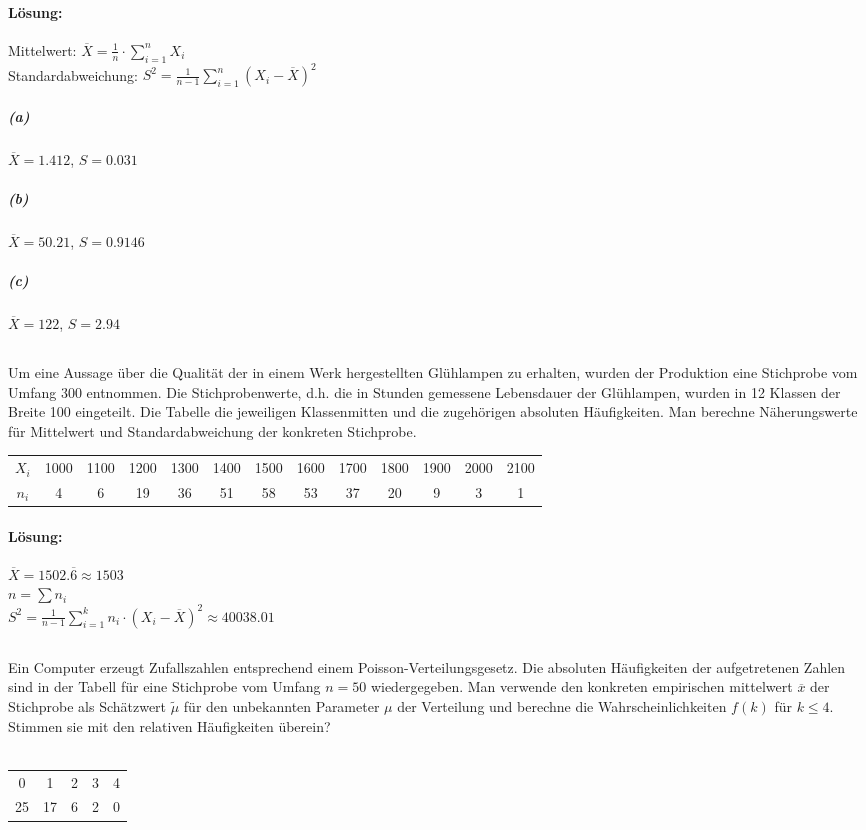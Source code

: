 \documentclass[ngerman]{scrartcl}
\begin{document}
\paragraph{Lösung:}
Mittelwert: $\overline{X}= \frac{1}{n}\cdot\sum_{i=1}^{n} X_i $\\
Standardabweichung: $S^{2} = \frac{1}{n-1}\sum_{i=1}^{n}\left(X_i - \overline{X}\right)^{2}$
\subparagraph{(a)}
$\overline{X} = 1.412$, $S = 0.031$
\subparagraph{(b)}
$\overline{X} = 50.21$, $S = 0.9146$
\subparagraph{(c)}
$\overline{X} = 122$, $S = 2.94$

\subsection{}
Um eine Aussage über die Qualität der in einem Werk hergestellten Glühlampen zu erhalten, wurden der Produktion eine Stichprobe vom Umfang 300 entnommen. Die Stichprobenwerte, d.h. die in Stunden gemessene Lebensdauer der Glühlampen, wurden in 12 Klassen der Breite 100 eingeteilt. Die Tabelle die jeweiligen Klassenmitten und die zugehörigen absoluten Häufigkeiten. Man berechne Näherungswerte für Mittelwert und Standardabweichung der konkreten Stichprobe.\\
\begin{tabular}{c c c c c c c c c c c c c}
\hline
$X_i$ & 1000 & 1100 & 1200 & 1300 & 1400 & 1500 & 1600 & 1700 & 1800 & 1900 & 2000 & 2100 \\
$n_i$ & 4 & 6 & 19 & 36 & 51 & 58 & 53 & 37 & 20 & 9 & 3 & 1 \\\hline
\end{tabular}
\paragraph{Lösung:}
$\overline{X} = 1502.\overline{6} \approx 1503$\\
$n = \sum n_i$\\
$S^{2} = \frac{1}{n-1}\sum_{i=1}^{k}  n_i \cdot (X_i - \overline{X})^{2} \approx 40038.01$ 
\subsection{}
Ein Computer erzeugt Zufallszahlen entsprechend einem Poisson-Verteilungsgesetz. Die absoluten Häufigkeiten der aufgetretenen Zahlen sind in der Tabell für eine Stichprobe vom Umfang $n=50$ wiedergegeben. Man verwende den konkreten empirischen mittelwert $\overline{x}$ der Stichprobe als Schätzwert $\tilde{\mu}$ für den unbekannten Parameter $\mu$ der Verteilung und berechne die Wahrscheinlichkeiten $f(k)$ für $k\le 4$. Stimmen sie mit den relativen Häufigkeiten überein?\\
\\
\begin{tabular}{c c c c c}
\hline
0& 1& 2& 3& 4\\
25& 17& 6& 2& 0\\\hline
\end{tabular}
\end{document}
